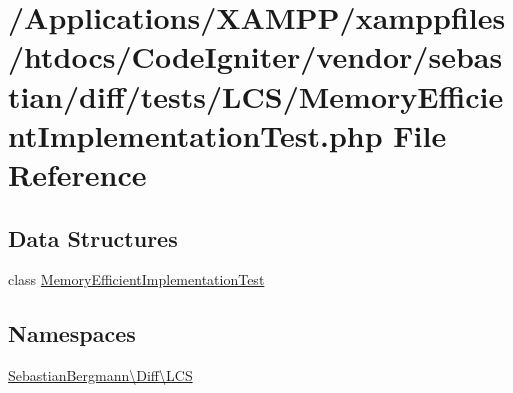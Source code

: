 \hypertarget{_memory_efficient_implementation_test_8php}{}\section{/\+Applications/\+X\+A\+M\+P\+P/xamppfiles/htdocs/\+Code\+Igniter/vendor/sebastian/diff/tests/\+L\+C\+S/\+Memory\+Efficient\+Implementation\+Test.php File Reference}
\label{_memory_efficient_implementation_test_8php}
\subsection*{Data Structures}
\begin{DoxyCompactItemize}
\item 
class \mbox{\hyperlink{class_sebastian_bergmann_1_1_diff_1_1_l_c_s_1_1_memory_efficient_implementation_test}{Memory\+Efficient\+Implementation\+Test}}
\end{DoxyCompactItemize}
\subsection*{Namespaces}
\begin{DoxyCompactItemize}
\item 
 \mbox{\hyperlink{namespace_sebastian_bergmann_1_1_diff_1_1_l_c_s}{Sebastian\+Bergmann\textbackslash{}\+Diff\textbackslash{}\+L\+CS}}
\end{DoxyCompactItemize}
